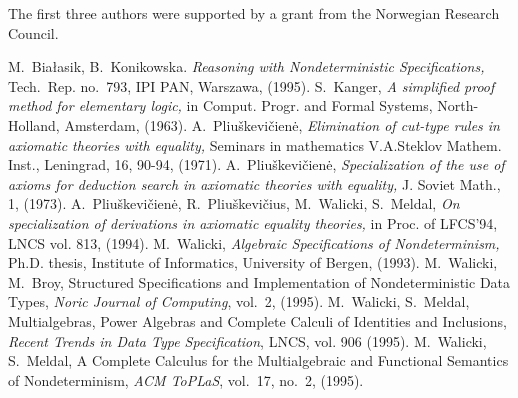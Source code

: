 The first three authors were supported by a grant from the Norwegian Research Council.

\begin{thebibliography}{MM99}\MyLPar
{} M.~Bia{\l}asik, B.~Konikowska. 
   {\em Reasoning with Nondeterministic Specifications,} Tech.~Rep. no.~793, IPI PAN, Warszawa,
   (1995).
 S.~Kanger,
   {\em A simplified proof method for elementary logic,}
   in Comput. Progr. and Formal Systems, North-Holland, Amsterdam, (1963).
 A.~Pliu\v skevi\v cien\.e, 
   {\em Elimination of cut-type rules in axiomatic theories with equality,}
   Seminars in mathematics V.A.Steklov Mathem. Inst., Leningrad, 16, 90-94, (1971).
 A.~Pliu\v skevi\v cien\.e,
   {\em Specialization of the use of axioms for deduction search in 
   axiomatic theories with equality,}
   J. Soviet Math., 1, (1973).
 A.~Pliu\v skevi\v cien\.e, R.~Pliu\v skevi\v cius,
   M.~Walicki, S.~Meldal,
   {\em On specialization of derivations in axiomatic equality theories,}
   in Proc. of LFCS'94, LNCS vol. 813, (1994).
 M.~Walicki,
   {\em Algebraic Specifications of Nondeterminism,}
   Ph.D. thesis, Institute of Informatics, University of Bergen, (1993).
 M.~Walicki, M.~Broy, Structured Specifications and Implementation of
   Nondeterministic Data Types, {\em Noric Journal of Computing}, vol.~2, (1995).
 M.~Walicki, S.~Meldal, 
   Multialgebras, Power Algebras and Complete Calculi of Identities and 
       Inclusions, {\em Recent Trends in Data Type  Specification}, LNCS, vol. 906 (1995).
 M.~Walicki, S.~Meldal, 
   A Complete Calculus for the Multialgebraic and Functional Semantics of Nondeterminism,  
       {\em ACM ToPLaS}, vol.~17, no.~2, (1995).
\end{thebibliography} 


